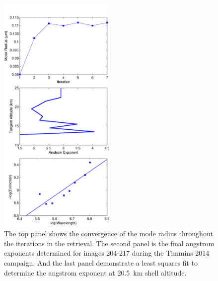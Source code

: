 \documentclass[12pt]{article}
\begin{document}
\begin{figure}
\includegraphics[width=0.5\textwidth]{./Images/ParticelSize.pdf}
    \caption{The top panel shows the convergence of the mode radius throughout the iterations in the retrieval. The second panel is the final angstrom exponents determined for images 204-217 during the Timmins 2014 campaign. And the last panel demonstrate a least squares fit to determine the angstrom exponent at 20.5~km shell altitude.}
    \label{fig:ParticleSize}
\end{figure}
\end{document}
